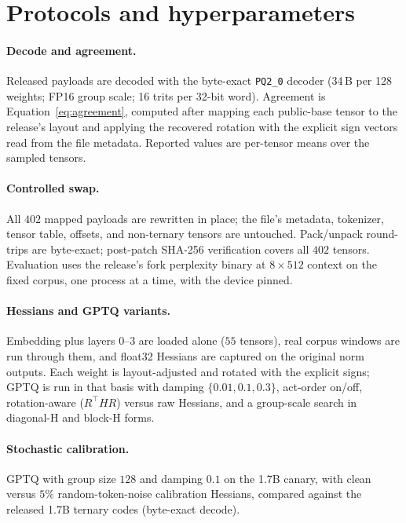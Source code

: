 \section{Protocols and hyperparameters}
\label{app:protocols}

\paragraph{Decode and agreement.}
Released payloads are decoded with the byte-exact \texttt{PQ2\_0} decoder
(34\,B per 128 weights; FP16 group scale; 16 trits per 32-bit word). Agreement
is Equation~\ref{eq:agreement}, computed after mapping each public-base tensor
to the release's layout and applying the recovered rotation with the explicit
sign vectors read from the file metadata. Reported values are per-tensor means
over the sampled tensors.

\paragraph{Controlled swap.}
All $402$ mapped payloads are rewritten in place; the file's metadata,
tokenizer, tensor table, offsets, and non-ternary tensors are untouched.
Pack/unpack round-trips are byte-exact; post-patch SHA-256 verification covers
all $402$ tensors. Evaluation uses the release's fork perplexity binary at
$8\times512$ context on the fixed corpus, one process at a time, with the
device pinned.

\paragraph{Hessians and GPTQ variants.}
Embedding plus layers $0$--$3$ are loaded alone ($55$ tensors), real corpus
windows are run through them, and float32 Hessians are captured on the original
norm outputs. Each weight is layout-adjusted and rotated with the explicit
signs; GPTQ is run in that basis with damping
$\{0.01, 0.1, 0.3\}$, act-order on/off, rotation-aware ($R^{\top} H R$) versus
raw Hessians, and a group-scale search in diagonal-H and block-H forms.

\paragraph{Stochastic calibration.}
GPTQ with group size $128$ and damping $0.1$ on the 1.7B canary, with clean
versus $5\%$ random-token-noise calibration Hessians, compared against the
released 1.7B ternary codes (byte-exact decode).

